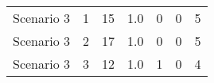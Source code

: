 {\begin{tabular}{lllllll}
	Scenario 3 & 1             & 15                 & 1.0          & 0                                                                          & 0					& 5                                                                                \\
	Scenario 3 & 2             & 17                 & 1.0          & 0                                                                          & 0					& 5                                                                                \\
	Scenario 3 & 3             & 12                 & 1.0          & 1                                                                          & 0					& 4                                                                                 \\
	\bottomrule
\end{tabular}

\vspace{1cm}

}
